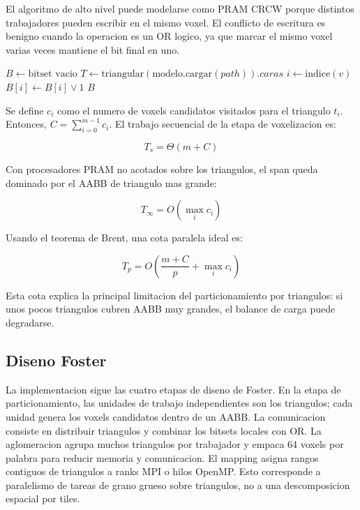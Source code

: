 \documentclass[conference]{IEEEtran}
\begin{document}
El algoritmo de alto nivel puede modelarse como PRAM CRCW porque distintos
trabajadores pueden escribir en el mismo voxel. El conflicto de escritura es
benigno cuando la operacion es un OR logico, ya que marcar el mismo voxel varias
veces mantiene el bit final en uno.

\begin{algorithm}
    \caption{Voxelizacion (PRAM)}
    \begin{algorithmic}[1]
        \State$B \gets \text{bitset vacio}$
        \State$T \gets \text{triangular}(\text{modelo.cargar}(path)).caras$
        \State$i \gets \text{indice}(v)$
        \State$B[i] \gets B[i] \lor 1$
        \EndFor{}
        \EndFor{}
        \State\Return$B$
    \end{algorithmic}
\end{algorithm}

Se define $c_i$ como el numero de voxels candidatos visitados para el triangulo
$t_i$. Entonces, $C=\sum_{i=0}^{m-1} c_i$. El trabajo secuencial de la etapa de
voxelizacion es:

\[
    T_s = \Theta(m + C)
\]

Con procesadores PRAM no acotados sobre los triangulos, el span queda dominado
por el AABB de triangulo mas grande:\@

\[
    T_{\infty} = O(\max_i c_i)
\]

Usando el teorema de Brent, una cota paralela ideal es:

\[
    T_p = O\left(\frac{m+C}{p} + \max_i c_i\right)
\]

Esta cota explica la principal limitacion del particionamiento por triangulos:
si unos pocos triangulos cubren AABB muy grandes, el balance de carga puede
degradarse.

\subsection{Diseno Foster}

La implementacion sigue las cuatro etapas de diseno de Foster. En la etapa de
particionamiento, las unidades de trabajo independientes son los triangulos;
cada unidad genera los voxels candidatos dentro de un AABB. La comunicacion
consiste en distribuir triangulos y combinar los bitsets locales con OR. La
aglomeracion agrupa muchos triangulos por trabajador y empaca 64 voxels por
palabra para reducir memoria y comunicacion. El mapping asigna rangos contiguos
de triangulos a ranks MPI o hilos OpenMP. Esto corresponde a paralelismo de
tareas de grano grueso sobre triangulos, no a una descomposicion espacial por
tiles.
\end{document}
